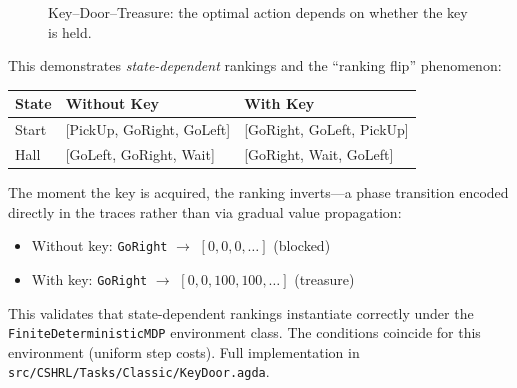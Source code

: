 \documentclass[9pt,a4paper]{article}
\newcommand{\fpath}[1]{\nolinkurl{#1}}
\theoremstyle{plain}
\theoremstyle{definition}
\theoremstyle{remark}
\begin{document}
\begin{figure}[H]
\centering
{}
\caption{Key--Door--Treasure: the optimal action depends on whether the key is held.}
\label{fig:key-door}
\end{figure}

\noindent This demonstrates \emph{state-dependent} rankings and the ``ranking flip'' phenomenon:

\begin{center}
\small
\begin{tabular}{l|l|l}
\textbf{State} & \textbf{Without Key} & \textbf{With Key} \\
\hline
Start & [PickUp, GoRight, GoLeft] & [GoRight, GoLeft, PickUp] \\
Hall  & [GoLeft, GoRight, Wait] & [GoRight, Wait, GoLeft] \\
\end{tabular}
\end{center}

The moment the key is acquired, the ranking inverts---a phase transition encoded directly in the traces rather than via gradual value propagation:
\begin{itemize}
\item Without key: \texttt{GoRight} $\to$ $[0, 0, 0, \ldots]$ (blocked)
\item With key: \texttt{GoRight} $\to$ $[0, 0, 100, 100, \ldots]$ (treasure)
\end{itemize}

\begin{sloppypar}
\noindent This validates that state-dependent rankings instantiate correctly under the \texttt{FiniteDeterministicMDP} environment class.  The conditions coincide for this environment (uniform step costs).  Full implementation in \fpath{src/CSHRL/Tasks/Classic/KeyDoor.agda}.
\end{sloppypar}
\end{document}
